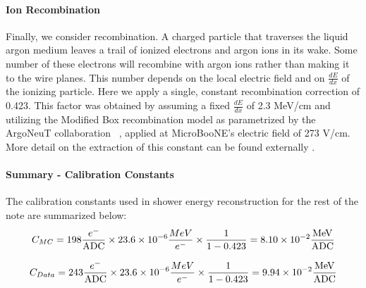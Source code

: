 \documentclass{article}
\begin{document}
\paragraph{Ion Recombination} Finally, we consider recombination.  A charged particle that traverses the liquid argon medium leaves a trail of ionized electrons and argon ions in its wake.  Some number of these electrons will recombine with argon ions rather than making it to the wire planes. This number depends on the local electric field and on $\frac{dE}{dx}$ of the ionizing particle. Here we apply a single, constant recombination correction of 0.423. This factor was obtained by assuming a fixed $\frac{dE}{dx}$ of 2.3 MeV/cm  and utilizing the Modified Box recombination model as parametrized by the ArgoNeuT collaboration ~\cite{bib:argoneut_recomb}, applied at MicroBooNE's electric field of 273 V/cm.  More detail on the extraction of this constant can be found externally \cite{bib:davidc_recomb}.
\paragraph{Summary - Calibration Constants}
The calibration constants used in shower energy reconstruction for the rest of the note are summarized below:
\begin{equation}
  C_{MC} = 198 \frac{e^-}{\rm ADC} \times 23.6 \times 10^{-6} \frac{MeV}{e^-} \times \frac{1}{1-0.423} = 8.10 \times 10^{-2} \frac{\rm MeV}{\rm ADC}
\end{equation}

\begin{equation}
  C_{Data} = 243 \frac{e^-}{\rm ADC} \times 23.6 \times 10^{-6} \frac{MeV}{e^-} \times \frac{1}{1-0.423} = 9.94 \times 10^{-2} \frac{\rm MeV}{\rm ADC}
\end{equation}
\end{document}
